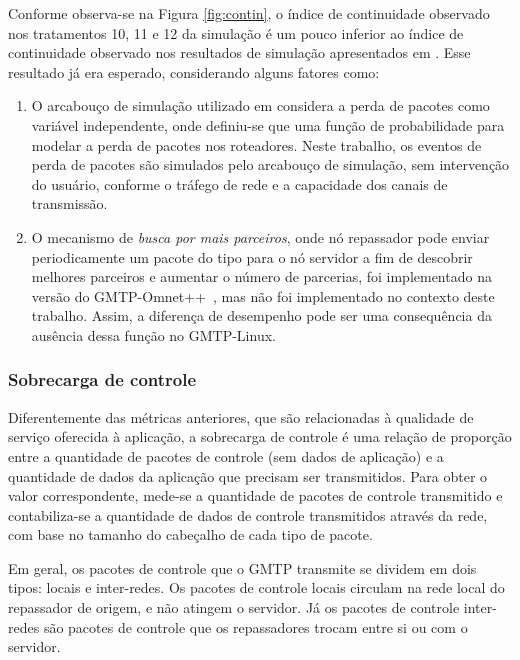 Conforme observa-se na Figura \ref{fig:contin}, o índice de continuidade observado nos tratamentos 10, 11 e 12 da simulação é um pouco inferior ao índice de continuidade observado nos resultados de simulação apresentados em \cite{sales2014gmtp}.  
Esse resultado já era esperado, considerando alguns fatores como: 
\begin{enumerate}
	\item O arcabouço de simulação utilizado em \cite{sales2014gmtp} considera a perda de pacotes como variável independente, onde definiu-se que uma função de probabilidade para modelar a perda de pacotes nos roteadores. 
	Neste trabalho, os eventos de perda de pacotes são simulados pelo arcabouço de simulação, sem intervenção do usuário, conforme o tráfego de rede e a capacidade dos canais de transmissão.
	\item O mecanismo de \textit{busca por mais parceiros}, onde nó repassador pode enviar periodicamente um pacote do tipo  para o nó servidor a fim de descobrir melhores parceiros e aumentar o número de parcerias, foi implementado na versão do GMTP-Omnet++~\cite{sales2014gmtp}, mas não foi implementado no contexto deste trabalho.
	Assim, a diferença de desempenho pode ser uma consequência da ausência dessa função no GMTP-Linux.
\end{enumerate}

\subsubsection{Sobrecarga de controle}

Diferentemente das métricas anteriores, que são relacionadas à qualidade de serviço oferecida à aplicação, a sobrecarga de controle é uma relação de proporção entre a quantidade de pacotes de controle (sem dados de aplicação) e a quantidade de dados da aplicação que precisam ser transmitidos.
Para obter o valor correspondente, mede-se a quantidade de pacotes de controle transmitido e contabiliza-se a quantidade de dados de controle transmitidos através da rede, com base no tamanho do cabeçalho de cada tipo de pacote.

Em geral, os pacotes de controle que o GMTP transmite se dividem em dois tipos: locais e inter-redes.
Os pacotes de controle locais circulam na rede local do repassador de origem, e não atingem o servidor.
Já os pacotes de controle inter-redes são pacotes de controle que os repassadores trocam entre si ou com o servidor.

